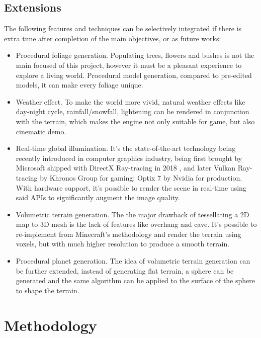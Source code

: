 \documentclass[oneside, a4paper]{article}
\begin{document}
    \subsection{Extensions}
    The following features and techniques can be selectively integrated if there is extra time after completion of the main objectives, or as future works:
    \begin{itemize}[label=\(\diamond\)]
        \item Procedural foliage generation. Populating trees, flowers and bushes is not the main focused of this project, however it must be a pleasant experience to explore a living world. Procedural model generation, compared to pre-edited models, it can make every foliage unique.
        \item Weather effect. To make the world more vivid, natural weather effects like day-night cycle, rainfall/snowfall, lightening can be rendered in conjunction with the terrain, which makes the engine not only suitable for game, but also cinematic demo.
        \item Real-time global illumination. It's the state-of-the-art technology being recently introduced in computer graphics industry, being first brought by Microsoft shipped with DirectX Ray-tracing in 2018 \cite{dxr_release}, and later Vulkan Ray-tracing by Khronos Group \cite{vulkan_rt_release} for gaming; Optix 7 by Nvidia \cite{optix} for production. With hardware support, it's possible to render the scene in real-time using said APIs to significantly augment the image quality.
        \item Volumetric terrain generation. The the major drawback of tessellating a 2D map to 3D mesh is the lack of features like overhang and cave. It's possible to re-implement from Minecraft's methodology and render the terrain using voxels, but with much higher resolution to produce a smooth terrain.
        \item Procedural planet generation. The idea of volumetric terrain generation can be further extended, instead of generating flat terrain, a sphere can be generated and the same algorithm can be applied to the surface of the sphere to shape the terrain.
    \end{itemize}

    \section{Methodology}
\end{document}
